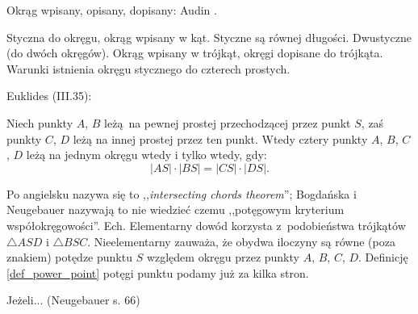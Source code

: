 
Okrąg wpisany, opisany, dopisany: Audin \cite[s. 98]{audin_2003}.

Styczna do okręgu, okrąg wpisany w kąt.
Styczne są równej długości.
Dwustyczne (do dwóch okręgów).
Okrąg wpisany w trójkąt, okręgi dopisane do trójkąta.
Warunki istnienia okręgu stycznego do czterech prostych.

Euklides (III.35):

\begin{proposition}
    \label{prop_intersecting_chords}
	Niech punkty $A$, $B$ leżą na pewnej prostej przechodzącej przez punkt $S$, zaś punkty $C$, $D$ leżą na innej prostej przez ten punkt.
	Wtedy cztery punkty $A$, $B$, $C$, $D$ leżą na jednym okręgu wtedy i tylko wtedy, gdy:
	\begin{equation}
		|AS| \cdot |BS| = |CS| \cdot |DS|.
	\end{equation}
\end{proposition}

Po angielsku nazywa się to ,,\emph{intersecting chords theorem}''; Bogdańska i Neugebauer nazywają to nie wiedzieć czemu ,,potęgowym kryterium współokręgowości''.
Ech.
Elementarny dowód korzysta z~podobieństwa trójkątów $\triangle ASD$ i $\triangle BSC$.
Nieelementarny zauważa, że obydwa iloczyny są równe (poza znakiem) potędze punktu $S$ względem okręgu przez punkty $A$, $B$, $C$, $D$.
Definicję \ref{def_power_point} potęgi punktu podamy już za kilka stron.
%

\begin{proposition}
	Jeżeli... (Neugebauer s. 66)
\end{proposition}

